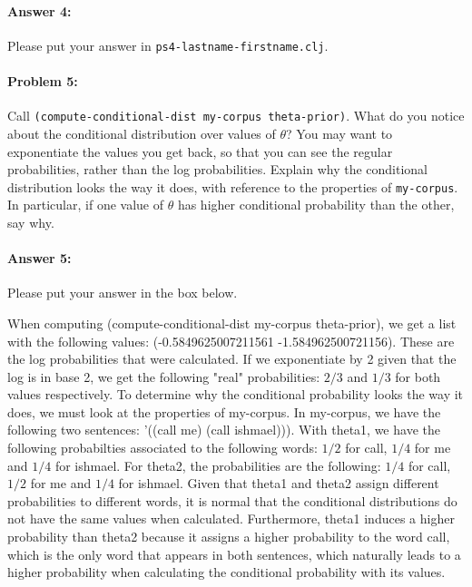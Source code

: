 \documentclass[10pt]{article}
\newenvironment{AnswerBox}{\begin{mdframed}[style=simple]}{\end{mdframed}}
\newcommand{\PSnum}{4}
\begin{document}
\paragraph{Answer 4:} Please put your answer in
\texttt{ps\PSnum-lastname-firstname.clj}.

\hrulefill %

\paragraph{Problem 5:}
Call \texttt{(compute-conditional-dist my-corpus theta-prior)}. What
do you notice about the conditional distribution over values of
$\theta$?  You may want to exponentiate the values you get back, so
that you can see the regular probabilities, rather than the log
probabilities. Explain why the conditional distribution looks the way
it does, with reference to the properties of \texttt{my-corpus}.  In
particular, if one value of $\theta$ has higher conditional probability
than the other, say why.

\paragraph{Answer 5:} Please put your answer in the box below.

\begin{AnswerBox}%

When computing (compute-conditional-dist my-corpus theta-prior), we get a list with the following values: (-0.5849625007211561 -1.584962500721156). These are the log probabilities that were calculated. If we exponentiate by 2 given that the log is in base 2, we get the following "real" probabilities: $2/3$ and $1/3$ for both values respectively. To determine why the conditional probability looks the way it does, we must look at the properties of my-corpus. In my-corpus, we have the following two sentences: '((call me) (call ishmael))). With theta1, we have the following probabilties associated to the following words: $1/2$ for call, $1/4$ for me and $1/4$ for ishmael. For theta2, the probabilities are the following: $1/4$ for call, $1/2$ for me and $1/4$ for ishmael. Given that theta1 and theta2 assign different probabilities to different words, it is normal that the conditional distributions do not have the same values when calculated. Furthermore, theta1 induces a higher probability than theta2 because it assigns a higher probability to the word call, which is the only word that appears in both sentences, which naturally leads to a higher probability when calculating the conditional probability with its values.

    
\end{AnswerBox}%
\end{document}

